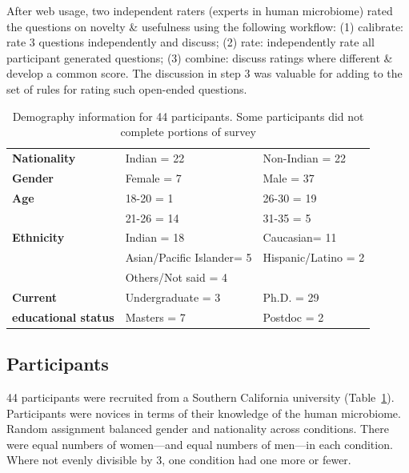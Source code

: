 After web usage, two independent raters (experts in human microbiome) rated the questions on novelty \& usefulness using the following workflow: (1) calibrate: rate 3 questions independently and discuss; (2) rate: independently rate all participant generated questions; (3) combine: discuss ratings where different \& develop a common score. The discussion in step 3 was valuable for adding to the set of rules for rating such open-ended questions. 

\vspace{0.25in}
\begin{table}[!ht]
\caption[Demography information for 44 participants]{Demography information for 44 participants. Some participants did not complete portions of survey}

\vspace{-0.25in}
\begin{center}
\renewcommand{\arraystretch}{1.5} %
\begin{tabular}{>{\bf}p{1.5in}p{1.5in}p{1.5in}}
\hline
Nationality	&	Indian = 22	&	Non-Indian = 22\\
Gender		&	Female = 7	&	Male = 37\\
Age			&	18-20 = 1		& 	26-30 = 19\\
			&	21-26 = 14	&	31-35 = 5\\
Ethnicity		&	Indian = 18	& 	Caucasian= 11\\
			&	Asian/Pacific Islander= 5	&	Hispanic/Latino = 2\\
			&	Others/Not said = 4	 &				\\
Current		& 	Undergraduate = 3	& Ph.D. = 29\\
 educational status 	&	Masters = 7	&	Postdoc = 2\\
\hline
\end{tabular}
\end{center}
\label{tab:gi-demo}
\end{table}

\subsection*{Participants}
44 participants were recruited from a Southern California university (Table~\ref{tab:gi-demo}). Participants were novices in terms of their knowledge of the human microbiome. Random assignment balanced gender and nationality across conditions. There were equal numbers of women---and equal numbers of men---in each condition. Where not evenly divisible by 3, one condition had one more or fewer. 

